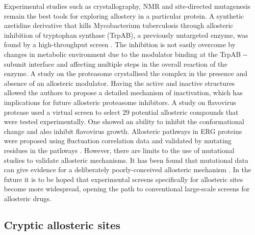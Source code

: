 Experimental studies such as crystallography, NMR and site-directed mutagenesis remain the best tools for exploring allostery in a particular protein.
A synthetic azetidine derivative that kills Mycobacterium tuberculosis through allosteric inhibition of tryptophan synthase (TrpAB), a previously untargeted enzyme, was found by a high-throughput screen \cite{Wellington2017}.
The inhibition is not easily overcome by changes in metabolic environment due to the modulator binding at the TrpAB \textalpha -\textbeta -subunit interface and affecting multiple steps in the overall reaction of the enzyme.
A study on the proteasome \cite{Haselbach2017} crystallised the complex in the presence and absence of an allosteric modulator.
Having the active and inactive structures allowed the authors to propose a detailed mechanism of inactivation, which has implications for future allosteric proteasome inhibitors.
A study on flavovirus protease \cite{Brecher2017} used a virtual screen to select 29 potential allosteric compounds that were tested experimentally.
One showed an ability to inhibit the conformational change and also inhibit flavovirus growth.
Allosteric pathways in ERG proteins were proposed using fluctuation correlation data and validated by mutating residues in the pathways \cite{Ye2017}.
However, there are limits to the use of mutational studies to validate allosteric mechanisms.
It has been found that mutational data can give evidence for a deliberately poorly-conceived allosteric mechanism \cite{Tang2017}.
In the future it is to be hoped that experimental screens specifically for allosteric sites \cite{Martin2012, Jayakar2017, Pellerano2017, Pisco2017, Raman2014} become more widespread, opening the path to conventional large-scale screens for allosteric drugs.


\subsection{Cryptic allosteric sites}


